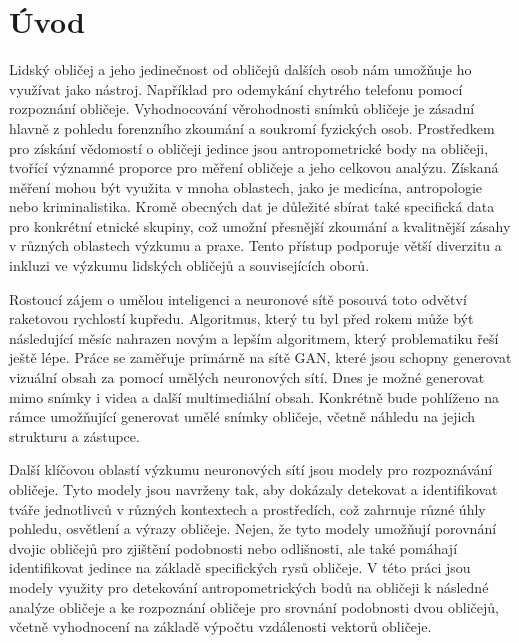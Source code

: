 
%

\chapter{Úvod}

Lidský obličej a jeho jedinečnost od obličejů dalších osob nám umožňuje ho využívat jako nástroj. Například pro odemykání chytrého telefonu pomocí rozpoznání obličeje. Vyhodnocování věrohodnosti snímků obličeje je zásadní hlavně z pohledu forenzního zkoumání a soukromí fyzických osob. Prostředkem pro získání vědomostí o obličeji jedince jsou antropometrické body na obličeji, tvořící významné proporce pro měření obličeje a jeho celkovou analýzu. Získaná měření mohou být využita v mnoha oblastech, jako je medicína, antropologie nebo kriminalistika. Kromě obecných dat je důležité sbírat také specifická data pro konkrétní etnické skupiny, což umožní přesnější zkoumání a kvalitnější zásahy v různých oblastech výzkumu a praxe. Tento přístup podporuje větší diverzitu a inkluzi ve výzkumu lidských obličejů a souvisejících oborů.

Rostoucí zájem o umělou inteligenci a neuronové sítě posouvá toto odvětví raketovou rychlostí kupředu. Algoritmus, který tu byl před rokem může být následující měsíc nahrazen novým a lepším algoritmem, který problematiku řeší ještě lépe. Práce se zaměřuje primárně na sítě GAN, které jsou schopny generovat vizuální obsah za pomocí umělých neuronových sítí. Dnes je možné generovat mimo snímky i videa a další multimediální obsah. Konkrétně bude pohlíženo na rámce umožňující generovat umělé snímky obličeje, včetně náhledu na jejich strukturu a zástupce.

Další klíčovou oblastí výzkumu neuronových sítí jsou modely pro rozpoznávání obličeje. Tyto modely jsou navrženy tak, aby dokázaly detekovat a identifikovat tváře jednotlivců v různých kontextech a prostředích, což zahrnuje různé úhly pohledu, osvětlení a výrazy obličeje. Nejen, že tyto modely umožňují porovnání dvojic obličejů pro zjištění podobnosti nebo odlišnosti, ale také pomáhají identifikovat jedince na základě specifických rysů obličeje. V této práci jsou modely využity pro detekování antropometrických bodů na obličeji k následné analýze obličeje a ke rozpoznání obličeje pro srovnání podobnosti dvou obličejů, včetně vyhodnocení na základě výpočtu vzdálenosti vektorů obličeje.

